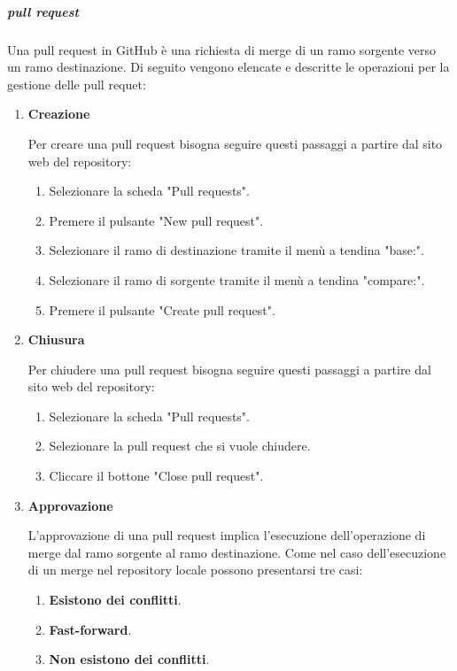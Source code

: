 \subparagraph{pull request}
Una pull request in GitHub è una richiesta di merge di un ramo sorgente verso un ramo destinazione.
Di seguito vengono elencate e descritte le operazioni per la gestione delle pull requet:
\begin{enumerate}
    \item \textbf{Creazione}\label{item:creazione_pull_request}
    
    Per creare una pull request bisogna seguire questi passaggi a partire dal sito web del repository:
    \begin{enumerate}
        \item Selezionare la scheda "Pull requests".
        \item Premere il pulsante "New pull request".
        \item Selezionare il ramo di destinazione tramite il menù a tendina "base:".    
        \item Selezionare il ramo di sorgente tramite il menù a tendina "compare:".
        \item Premere il pulsante "Create pull request".
    \end{enumerate}
    
    \item \textbf{Chiusura}\label{item:chiusura_pull_request}
    
    Per chiudere una pull request bisogna seguire questi passaggi a partire dal sito web del repository:
    \begin{enumerate}
        \item Selezionare la scheda "Pull requests".
        \item Selezionare la pull request che si vuole chiudere.
        \item Cliccare il bottone "Close pull request".
    \end{enumerate}

    \item \textbf{Approvazione} \label{item:approvazione_pull_request}
    
    L'approvazione di una pull request implica l'esecuzione dell'operazione di merge dal ramo sorgente al ramo destinazione.
    Come nel caso dell'esecuzione di un merge nel repository locale possono presentarsi tre casi:

    \begin{enumerate}
        \item \textbf{Esistono dei conflitti}.
        \item \textbf{Fast-forward}.
        \item \textbf{Non esistono dei conflitti}.
    \end{enumerate}


\end{enumerate}
